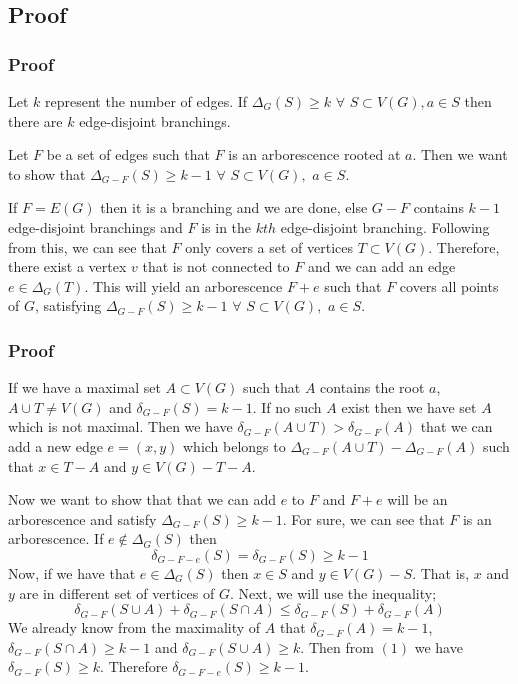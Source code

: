 \documentclass[8pt]{beamer}
\begin{document}
\subsection{Proof}
\begin{frame}
\frametitle{Proof}

Let $k$ represent the number of edges. If $\Delta_G(S) \ge k$ $\forall$ $S\subset V(G), a\in S$ then there are $k$ edge-disjoint branchings. 

Let $F$ be a set of edges such that $F$ is an arborescence rooted at $a$. Then we want to show that $\Delta_{G-F}(S) \ge k-1$ $\forall$ $S\subset V(G),$ $a\in S$.

If $F=E(G)$ then it is a branching and we are done, else $G-F$ contains $k-1$ edge-disjoint branchings and $F$ is in the $kth$ edge-disjoint branching. Following from this, we can see that $F$ only covers a set of vertices $T \subset V(G)$. Therefore, there exist a vertex $v$ that is not connected to $F$ and we can add an edge $e\in \Delta_G(T)$. This will yield an arborescence $F+e$ such that $F$ covers all points of $G$, satisfying $\Delta_{G-F}(S) \ge k-1$ $\forall$ $S\subset V(G),$ $a\in S$.

\end{frame}
\begin{frame}
\frametitle{Proof}

If we have a maximal set $A\subset V(G)$ such that $A$ contains the root $a$, $A \cup T \ne V(G)$ and $\delta_{G-F}(S) = k-1$. If no such $A$ exist then we have set $A$ which is not maximal. Then we have $\delta_{G-F}(A\cup T) > \delta_{G-F}(A)$ that we can add a new edge $e=(x,y)$ which belongs to $\Delta_{G-F}(A\cup T) - \Delta_{G-F}(A)$ such that $x\in T-A$ and $y\in V(G) -T-A$.

Now we want to show that that we can add $e$ to $F$ and $F+e$ will be an arborescence and satisfy $\Delta_{G-F}(S) \ge k-1$. For sure, we can see that $F$ is an arborescence. If $e\not\in \Delta_G(S)$ then $$\delta_{G-F-e}(S) = \delta_{G-F}(S) \ge k-1$$
Now, if we have that $e\in \Delta_G(S)$ then $x\in S$ and $y\in V(G)-S$. That is, $x$ and $y$ are in different set of vertices of $G$. Next, we will use the inequality; 
\begin{equation}\delta_{G-F}(S\cup A) + \delta_{G-F}(S\cap A) \le \delta_{G-F}(S) + \delta_{G-F}(A)\end{equation}
We already know from the maximality of $A$ that $\delta_{G-F}(A)=k-1$, $\delta_{G-F}(S\cap A) \ge k-1$ and $\delta_{G-F}(S\cup A) \ge k$. Then from $(1)$ we have $\delta_{G-F}(S) \ge k$. Therefore $\delta_{G-F-e}(S) \ge k-1$. 

\end{frame}
\end{document}
